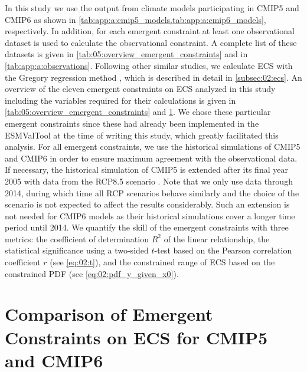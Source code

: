 In this study we use the output from climate models participating in
\acs{CMIP}5 and \acs{CMIP}6 as shown in
\cref{tab:app:a:cmip5_models,tab:app:a:cmip6_models}, respectively. In
addition, for each emergent constraint at least one observational dataset is
used to calculate the observational constraint. A complete list of these
datasets is given in \cref{tab:05:overview_emergent_constraints} and in
\cref{tab:app:a:observations}. Following other similar studies, we calculate
\ac{ECS} with the Gregory regression method \autocite{Gregory2004}, which is
described in detail in \cref{subsec:02:ecs}. An overview of the eleven emergent
constraints on \ac{ECS} analyzed in this study including the variables required
for their calculations is given in \cref{tab:05:overview_emergent_constraints}
and \cref{sec:05:comparison_of_emergent_constraints}. We chose these particular
emergent constraints since these had already been implemented in the
\ac{ESMValTool} at the time of writing this study, which greatly facilitated
this analysis. For all emergent constraints, we use the historical simulations
of \acs{CMIP}5 and \acs{CMIP}6 in order to ensure maximum agreement with the
observational data. If necessary, the historical simulation of \acs{CMIP}5 is
extended after its final year 2005 with data from the \acs{RCP}8.5 scenario
\autocite{Riahi2011}. Note that we only use data through 2014, during which
time all \ac{RCP} scenarios behave similarly and the choice of the scenario is
not expected to affect the results considerably. Such an extension is not
needed for \acs{CMIP}6 models as their historical simulations cover a longer
time period until 2014. We quantify the skill of the emergent constraints with
three metrics: the coefficient of determination $R^2$ of the linear
relationship, the statistical significance using a two-sided $t$-test based on
the Pearson correlation coefficient $r$ (see \cref{eq:02:t}), and the
constrained range of \ac{ECS} based on the constrained \ac{PDF} (see
\cref{eq:02:pdf_y_given_x0}).


\section{Comparison of Emergent Constraints on \acs{ECS} for \acs{CMIP}5 and
  \acs{CMIP}6}
\label{sec:05:comparison_of_emergent_constraints}

